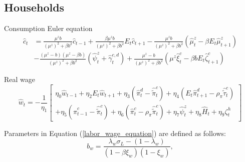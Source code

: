 \documentclass[12pt,oneside,a4paper]{article}
\begin{document}
\subsection*{Households}

Consumption Euler equation
\begin{equation}
    \begin{aligned}
\hat{c}_{t} &=\frac{\mu^{z} b}{\left(\mu^{z}\right)^{2}+\beta b^{2}} \hat{c}_{t-1}+\frac{\beta \mu^{z} b}{\left(\mu^{z}\right)^{2}+\beta b^{2}} E_{t} \hat{c}_{t+1}-\frac{\mu^{z} b}{\left(\mu^{z}\right)^{2}+\beta b^{2}}\left(\hat{\mu}_{t}^{z}-\beta E_{t} \hat{\mu}_{t+1}^{z}\right) \\
&-\frac{\left(\mu^{z}-b\right)\left(\mu^{z}-\beta b\right)}{\left(\mu^{z}\right)^{2}+\beta b^{2}}\left(\hat{\psi}_{t}^{z}+\hat{\gamma}_{t}^{c, d}\right)+\frac{\mu^{z}-b}{\left(\mu^{z}\right)^{2}+\beta b^{2}}\left(\mu^{z} \hat{\xi}_{t}^{c}-\beta b E_{t} \hat{\zeta}_{t+1}^{c}\right)
\end{aligned}
\end{equation}

Real wage
\begin{equation}
\label{labor_wage_equation}    \hat{w}_{t}=-\frac{1}{\eta_{1}}\left[\begin{array}{l}
    \eta_{0} \hat{w}_{t-1}+\eta_{2} E_{t} \hat{w}_{t+1}+\eta_{3}\left(\hat{\pi}_{t}^{d}-\hat{\tilde{\pi}}_{t}^{c}\right)+\eta_{4}\left(E_{t} \hat{\pi}_{t+1}^{d}-\rho_{\pi} \hat{\tilde{\tau}}_{t}^{c}\right) \\
    +\eta_{5}\left(\hat{\pi}_{t-1}^{c}-\hat{\tilde{\pi}}_{t}^{c}\right)+\eta_{6}\left(\hat{\pi}_{t}^{c}-\rho_{\pi} \hat{\tilde{\pi}}_{t}^{c}\right)+\eta_{7} \hat{\psi}_{t}^{z}+\eta_{8} \hat{H}_{t}+\eta_{9} \zeta_{t}^{h}
    \end{array}\right]
\end{equation}

Parameters in Equation (\ref{labor_wage_equation}) are defined as follows:
$$b_{w}=\frac{\lambda_{w} \sigma_{L}-\left(1-\lambda_{w}\right)}{\left(1-\beta \xi_{w}\right)\left(1-\xi_{w}\right)},$$
\end{document}
